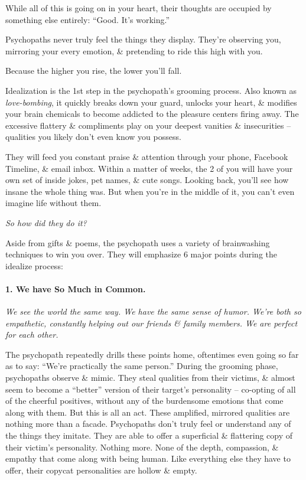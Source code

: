 \documentclass{article}
\numberwithin{equation}{section}
\begin{document}
While all of this is going on in your heart, their thoughts are occupied by something else entirely: ``Good. It's working.''

Psychopaths never truly feel the things they display. They're observing you, mirroring your every emotion, \& pretending to ride this high with you.

Because the higher you rise, the lower you'll fall.

Idealization is the 1st step in the psychopath's grooming process. Also known as \textit{love-bombing}, it quickly breaks down your guard, unlocks your heart, \& modifies your brain chemicals to become addicted to the pleasure centers firing away. The excessive flattery \& compliments play on your deepest vanities \& insecurities -- qualities you likely don't even know you possess.

They will feed you constant praise \& attention through your phone, Facebook Timeline, \& email inbox. Within a matter of weeks, the 2 of you will have your own set of inside jokes, pet names, \& cute songs. Looking back, you'll see how insane the whole thing was. But when you're in the middle of it, you can't even imagine life without them.

\textit{So how did they do it?}

Aside from gifts \& poems, the psychopath uses a variety of brainwashing techniques to win you over. They will emphasize 6 major points during the idealize process:

\paragraph{1. We have So Much in Common.} \textit{We see the world the same way. We have the same sense of humor. We're both so empathetic, constantly helping out our friends \& family members. We are perfect for each other.}

The psychopath repeatedly drills these points home, oftentimes even going so far as to say: ``We're practically the same person.'' During the grooming phase, psychopaths observe \& mimic. They steal qualities from their victims, \& almost seem to become a ``better'' version of their target's personality -- co-opting of all of the cheerful positives, without any of the burdensome emotions that come along with them. But this is all an act. These amplified, mirrored qualities are nothing more than a facade. Psychopaths don't truly feel or understand any of the things they imitate. They are able to offer a superficial \& flattering copy of their victim's personality. Nothing more. None of the depth, compassion, \& empathy that come along with being human. Like everything else they have to offer, their copycat personalities are hollow \& empty.
\end{document}
